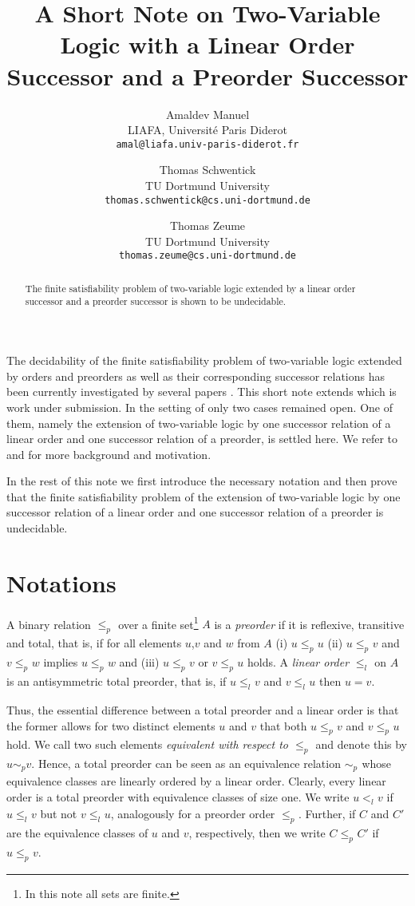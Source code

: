 \documentclass[11pt, a4paper]{article}
\title{A Short Note on Two-Variable Logic with a Linear Order Successor and a Preorder Successor}
\author{Amaldev Manuel\\
\small LIAFA, Universit\'e Paris Diderot\\ 
\small  \texttt{amal@liafa.univ-paris-diderot.fr}
\and 
Thomas Schwentick\\
\small TU Dortmund University\\
\small \texttt{thomas.schwentick@cs.uni-dortmund.de}
\and 
Thomas Zeume\\
\small TU Dortmund University\\
\small  \texttt{thomas.zeume@cs.uni-dortmund.de}
}
\renewcommand{\(}{\left (}
\renewcommand{\)}{\right )}
\newcommand{\myemph}[1]{\emph{#1}}
\theoremstyle{plain}
\newcommand{\tpo}{total preorder\xspace}
\newcommand{\tlo}{linear order\xspace}
\newcommand{\po}[1][]{\ensuremath{\leq_{p_{#1}}}}
\newcommand{\lo}[1][]{\ensuremath{\leq_{l_{#1}}}}
\newcommand{\slo}[1][]{\ensuremath{<_{l_{#1}}}}
\newcommand{\psim}[1][]{\ensuremath{\sim_{p_{#1}}}}
\begin{document}
\maketitle

\begin{abstract}
  The finite satisfiability problem of two-variable logic extended by a linear order successor and a preorder successor is shown to be undecidable.
\end{abstract}


  \makeatletter{}The decidability of the finite satisfiability problem of two-variable logic extended by orders and preorders  as well as their corresponding successor relations has been currently investigated by several papers \cite{Manuel10, SchwentickZ11, ManuelZ13}. This short note extends \cite{ManuelZ13} which is work under submission. In the setting of \cite{ManuelZ13} only two cases remained open. One of them, namely the extension of two-variable logic by one successor relation of a linear order and one successor relation of a preorder, is settled here. We refer to \cite{Manuel10} and \cite{SchwentickZ11} for more background and motivation.

In the rest of this note we first introduce the necessary notation and then prove that the finite satisfiability problem of the extension of two-variable logic by one successor relation of a linear order and one successor relation of a preorder is undecidable.

\section{Notations}
A binary relation $\po$ over a finite set\footnote{In this note all sets are finite.} $A$ is a \myemph{preorder} if it is reflexive, transitive and total, that is, if for all elements $u$,$v$ and $w$ from $A$ (i) $u \po u$ (ii) $u \po v$ and $v \po w$ implies $u \po w$ and (iii) $u \po v $ or  $v \po u$ holds. A \myemph{\tlo} $\lo$ on $A$ is an antisymmetric total preorder, that is, if $u \lo v$ and $v \lo u$ then $u = v$.

Thus, the essential difference between a \tpo and a \tlo is that the former allows for two distinct elements $u$ and $v$ that both  $u
\po v$ and $v \po u$ hold. We call two such elements \myemph{equivalent with respect to $\po$} and denote this by $u \sim_p v$.
Hence, a \tpo can be seen as an equivalence relation $\psim$ whose equivalence classes are linearly ordered by a linear order. Clearly, every \tlo is a \tpo with equivalence classes of size one. We write  $u \slo v$ if $u \lo v$ but not $v \lo u$, analogously for a preorder order $\po$. Further, if $C$ and $C'$ are the equivalence classes of $u$ and $v$, respectively, then we write $C \po C'$ if $u \po v$.
\end{document}
